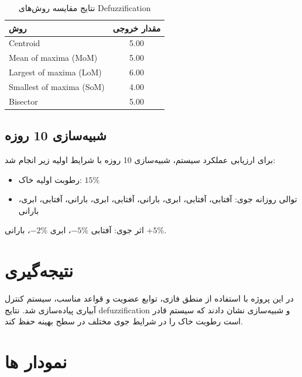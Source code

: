 \documentclass[12pt]{exam}
\begin{document}
	\begin{table}[h]
		\centering
		\caption{نتایج مقایسه روش‌های Defuzzification}
		\begin{tabular}{lc}
			\hline
			روش & مقدار خروجی \\
			\hline
			Centroid & 5.00 \\
			Mean of maxima (MoM) & 5.00 \\
			Largest of maxima (LoM) & 6.00 \\
			Smallest of maxima (SoM) & 4.00 \\
			Bisector & 5.00 \\
			\hline
		\end{tabular}
	\end{table}
	
	\subsection{شبیه‌سازی 10 روزه}
	برای ارزیابی عملکرد سیستم، شبیه‌سازی 10 روزه با شرایط اولیه زیر انجام شد:
	\begin{itemize}
		\item رطوبت اولیه خاک: \(15\%\)
		\item توالی روزانه جوی: آفتابی، آفتابی، ابری، بارانی، آفتابی، ابری، بارانی، آفتابی، ابری، بارانی
	\end{itemize}
	
	اثر جوی: آفتابی \(-5\%\)، ابری \(-2\%\)، بارانی \(+5\%\).
	

	\section{نتیجه‌گیری}
	در این پروژه با استفاده از منطق فازی، توابع عضویت و قواعد مناسب، سیستم کنترل آبیاری پیاده‌سازی شد. نتایج defuzzification و شبیه‌سازی نشان دادند که سیستم قادر است رطوبت خاک را در شرایط جوی مختلف در سطح بهینه حفظ کند.
	
	\section{نمودار ها}
	
\end{document}
